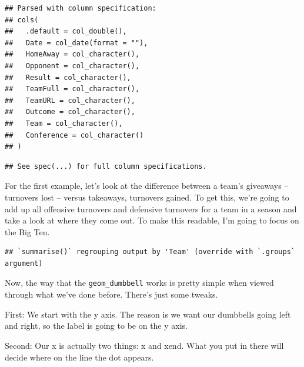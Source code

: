 \documentclass[
]{book}
\newenvironment{Shaded}{\begin{snugshade}}{\end{snugshade}}
\newcommand{\DataTypeTok}[1]{\textcolor[rgb]{0.13,0.29,0.53}{#1}}
\newcommand{\KeywordTok}[1]{\textcolor[rgb]{0.13,0.29,0.53}{\textbf{#1}}}
\newcommand{\NormalTok}[1]{#1}
\newcommand{\OperatorTok}[1]{\textcolor[rgb]{0.81,0.36,0.00}{\textbf{#1}}}
\newcommand{\StringTok}[1]{\textcolor[rgb]{0.31,0.60,0.02}{#1}}
\begin{document}
\begin{verbatim}
## Parsed with column specification:
## cols(
##   .default = col_double(),
##   Date = col_date(format = ""),
##   HomeAway = col_character(),
##   Opponent = col_character(),
##   Result = col_character(),
##   TeamFull = col_character(),
##   TeamURL = col_character(),
##   Outcome = col_character(),
##   Team = col_character(),
##   Conference = col_character()
## )
\end{verbatim}

\begin{verbatim}
## See spec(...) for full column specifications.
\end{verbatim}

For the first example, let's look at the difference between a team's giveaways -- turnovers lost -- versus takeaways, turnovers gained. To get this, we're going to add up all offensive turnovers and defensive turnovers for a team in a season and take a look at where they come out. To make this readable, I'm going to focus on the Big Ten.

\begin{Shaded}
\end{Shaded}

\begin{verbatim}
## `summarise()` regrouping output by 'Team' (override with `.groups` argument)
\end{verbatim}

Now, the way that the \texttt{geom\_dumbbell} works is pretty simple when viewed through what we've done before. There's just some tweaks.

First: We start with the y axis. The reason is we want our dumbbells going left and right, so the label is going to be on the y axis.

Second: Our x is actually two things: x and xend. What you put in there will decide where on the line the dot appears.
\end{document}
